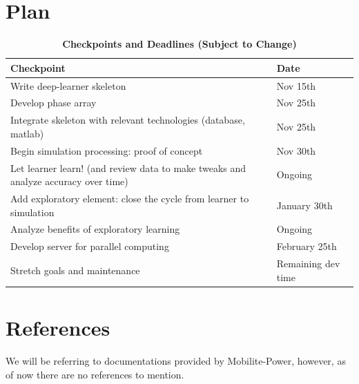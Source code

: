 \documentclass[12pt, titlepage]{article}
\begin{document}
\section{Plan}

\begin{table}[H]
\centering
\caption{\bf Checkpoints and Deadlines (Subject to Change)}
\begin{tabular}{ |p{6cm}|p{3cm}|  } 
 \hline
\bf Checkpoint & \bf Date\\
 \hline
Write deep-learner skeleton & Nov 15th\\
 \hline
Develop phase array & Nov 25th\\
 \hline
Integrate skeleton with relevant technologies (database, matlab) & Nov 25th\\
  \hline
Begin simulation processing: proof of concept & Nov 30th\\
\hline
Let learner learn! (and review data to make tweaks and analyze accuracy over time) & Ongoing\\
\hline
Add exploratory element: close the cycle from learner to simulation & January 30th\\
\hline
Analyze benefits of exploratory learning & Ongoing\\
\hline
Develop server for parallel computing & February 25th\\
\hline
Stretch goals and maintenance & Remaining dev time\\
\hline
\end{tabular}
\end{table}

\section*{References}
We will be referring to documentations provided by Mobilite-Power, however, as of now there are no references to mention.





\newpage

\newpage{}
\end{document}
